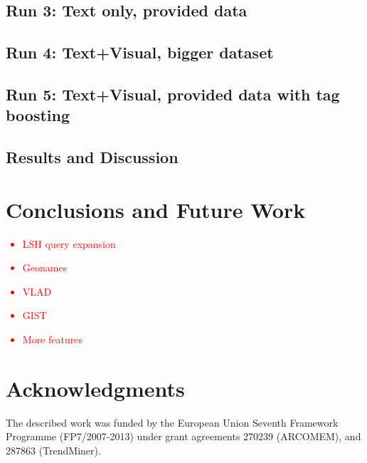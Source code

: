 \documentclass{../acm_proc_article-me11_tweaked}
\begin{document}
\subsection{Run 3: Text only, provided data}
\subsection{Run 4: Text+Visual, bigger dataset}
\subsection{Run 5: Text+Visual, provided data with tag boosting}
\subsection{Results and Discussion}

\section{Conclusions and Future Work}
\textcolor{red}{\begin{itemize}
    \item LSH query expansion
    \item Geonames
    \item VLAD
    \item GIST
    \item More features
\end{itemize}}

\section{Acknowledgments}
The described work was funded by the European Union Seventh Framework Programme (FP7/2007-2013) under grant agreements 270239 (ARCOMEM), and 287863 (TrendMiner).




\end{document}
